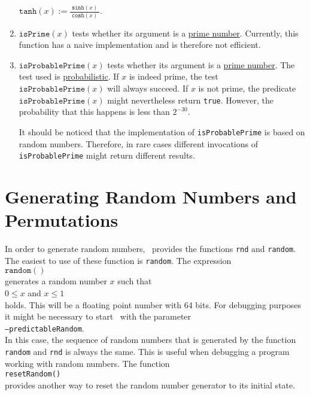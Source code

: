 \begin{enumerate}
      \hspace*{1.3cm}
      $\mathtt{tanh}(x) := \displaystyle \frac{\;\mathtt{sinh}(x)\;}{\mathtt{cosh}(x)}$.
\item $\texttt{isPrime}(x)$ tests whether its argument is a 
      \href{https://en.wikipedia.org/wiki/Prime_number}{prime number}.  Currently, 
      this function has a naive implementation and is therefore not efficient.
\item $\texttt{isProbablePrime}(x)$ tests whether its argument is a
      \href{https://en.wikipedia.org/wiki/Prime_number}{prime number}.  The test 
      used is 
      \href{https://en.wikipedia.org/wiki/Miller-Rabin-primality_test}{probabilistic}.  If
      $x$ is indeed  prime, the test $\texttt{isProbablePrime}(x)$ 
      will always succeed.  If $x$ is not prime, the predicate $\texttt{isProbablePrime}(x)$
      might nevertheless return \texttt{true}.  However, the probability that this happens
      is less than $2^{-30}$.

      It should be noticed that the implementation of \texttt{isProbablePrime} is
      based on random numbers.  Therefore, in rare cases different invocations of
      \texttt{isProbablePrime} might return different results.  
\end{enumerate}


\section{Generating Random Numbers and Permutations}
In order to generate random numbers, \setlx\ provides the functions \texttt{rnd} and
\texttt{random}.  The easiest to use of these function is \texttt{random}.  The expression
\\[0.2cm]
\hspace*{1.3cm}
$\texttt{random}()$
\\[0.2cm]
generates a random number $x$ such that 
\\[0.2cm]
\hspace*{1.3cm}
$0 \leq x$ \quad and \quad $x \leq 1$
\\[0.2cm]
holds.  This will be a floating point number with 64 bits.  For debugging purposes it might be necessary to start \setlx\ with
the parameter
\\[0.2cm]
\hspace*{1.3cm}
\texttt{--predictableRandom}.
\\[0.2cm]
In this case, the sequence of random numbers that is generated by the function \texttt{random} and
\texttt{rnd} is always the same.  This is useful when debugging a program working with
random numbers.  The function 
\\[0.2cm]
\hspace*{1.3cm}
\texttt{resetRandom()}
\\[0.2cm]
provides another way to reset the random number generator to its initial state.

